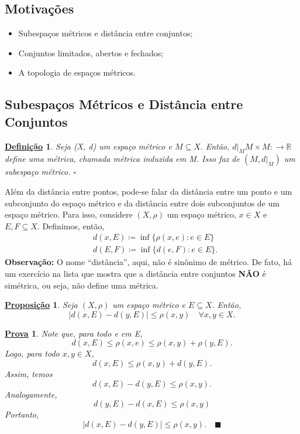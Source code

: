 \documentclass{article}
\newtheorem*{def*}{\underline{Defini\c c\~ao}}
\newtheorem*{prop*}{\underline{Proposi\c c\~ao}}
\newtheorem*{proof*}{\underline{Prova}}
\renewcommand\qedsymbol{$\blacksquare$}
\begin{document}
\subsection{Motivações}
\begin{itemize}
  \item Subespaços métricos e distância entre conjuntos;
  \item Conjuntos limitados, abertos e fechados;
  \item A topologia de espaços métricos.
\end{itemize}
\subsection{Subespaços Métricos e Distância entre Conjuntos}
\begin{def*}
  Seja (X, d) um espaço métrico e \(M\subseteq{X}.\) Então, \(d|_{M}M\times M:\rightarrow \mathbb{R}\)
define uma métrica, chamada métrica induzida em M. Isso faz de \((M, d|_M)\) um subespaço métrico. \(\square\)
\end{def*}
  Além da distância entre pontos, pode-se falar da distância entre um ponto e um subconjunto do espaço métrico
e da distância entre dois subconjuntos de um espaço métrico. Para isso, considere \((X, \rho )\) um espaço métrico, 
 \(x\in X\) e \(E, F\subseteq{X}.\) Definimos, então,
\begin{align*}
  &d(x, E)\coloneqq \inf\{\rho (x, e): e\in E\}\\
  &d(E, F)\coloneqq \inf\{d(e, F): e\in E\}.
\end{align*}
\textbf{Observação:} O nome ``distância'', aqui, não é sinônimo de métrico. De fato, há um exercício na lista que mostra que a distância entre conjuntos
\textbf{NÃO} é simétrica, ou seja, não define uma métrica.
\begin{prop*}
  Seja \((X, \rho )\) um espaço métrico e \(E\subseteq{X}.\) Então, 
    \[
      |d(x, E) - d(y, E)|\leq \rho (x, y) \quad \forall x, y\in X.
    \]
\end{prop*}
\begin{proof*}
  Note que, para todo e em E, 
    \[
      d(x, E)\leq \rho (x, e)\leq \rho (x, y) + \rho (y, E).
    \]
  Logo, para todo \(x, y\in X\), 
    \[
      d(x, E)\leq \rho (x, y) + d(y, E).
    \]
  Assim, temos 
    \[
      d(x, E) - d(y, E)\leq \rho (x, y).
    \]
  Analogamente, 
    \[
      d(y, E) - d(x, E)\leq \rho (x, y)
    \]
  Portanto, 
    \[
      |d(x, E) - d(y, E)|\leq \rho (x, y).\quad\text{\qedsymbol}
    \]
\end{proof*}
\end{document}
